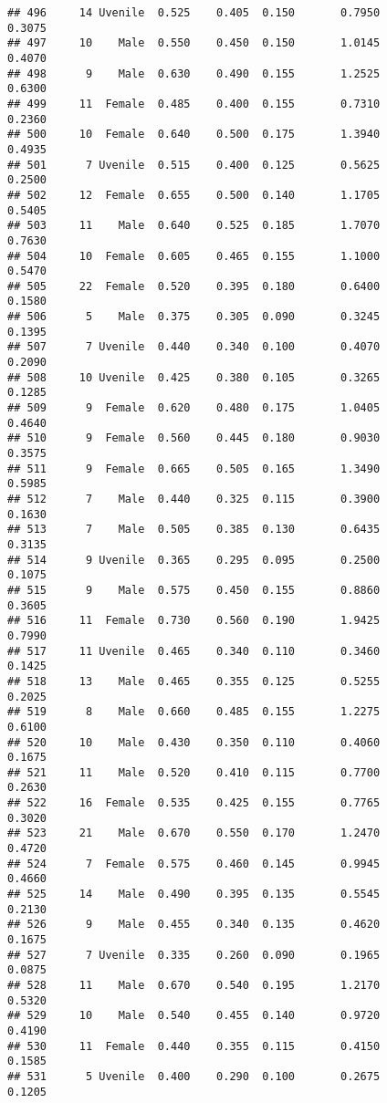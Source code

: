 \documentclass[
]{article}
\begin{document}
\begin{verbatim}
## 496     14 Uvenile  0.525    0.405  0.150       0.7950         0.3075
## 497     10    Male  0.550    0.450  0.150       1.0145         0.4070
## 498      9    Male  0.630    0.490  0.155       1.2525         0.6300
## 499     11  Female  0.485    0.400  0.155       0.7310         0.2360
## 500     10  Female  0.640    0.500  0.175       1.3940         0.4935
## 501      7 Uvenile  0.515    0.400  0.125       0.5625         0.2500
## 502     12  Female  0.655    0.500  0.140       1.1705         0.5405
## 503     11    Male  0.640    0.525  0.185       1.7070         0.7630
## 504     10  Female  0.605    0.465  0.155       1.1000         0.5470
## 505     22  Female  0.520    0.395  0.180       0.6400         0.1580
## 506      5    Male  0.375    0.305  0.090       0.3245         0.1395
## 507      7 Uvenile  0.440    0.340  0.100       0.4070         0.2090
## 508     10 Uvenile  0.425    0.380  0.105       0.3265         0.1285
## 509      9  Female  0.620    0.480  0.175       1.0405         0.4640
## 510      9  Female  0.560    0.445  0.180       0.9030         0.3575
## 511      9  Female  0.665    0.505  0.165       1.3490         0.5985
## 512      7    Male  0.440    0.325  0.115       0.3900         0.1630
## 513      7    Male  0.505    0.385  0.130       0.6435         0.3135
## 514      9 Uvenile  0.365    0.295  0.095       0.2500         0.1075
## 515      9    Male  0.575    0.450  0.155       0.8860         0.3605
## 516     11  Female  0.730    0.560  0.190       1.9425         0.7990
## 517     11 Uvenile  0.465    0.340  0.110       0.3460         0.1425
## 518     13    Male  0.465    0.355  0.125       0.5255         0.2025
## 519      8    Male  0.660    0.485  0.155       1.2275         0.6100
## 520     10    Male  0.430    0.350  0.110       0.4060         0.1675
## 521     11    Male  0.520    0.410  0.115       0.7700         0.2630
## 522     16  Female  0.535    0.425  0.155       0.7765         0.3020
## 523     21    Male  0.670    0.550  0.170       1.2470         0.4720
## 524      7  Female  0.575    0.460  0.145       0.9945         0.4660
## 525     14    Male  0.490    0.395  0.135       0.5545         0.2130
## 526      9    Male  0.455    0.340  0.135       0.4620         0.1675
## 527      7 Uvenile  0.335    0.260  0.090       0.1965         0.0875
## 528     11    Male  0.670    0.540  0.195       1.2170         0.5320
## 529     10    Male  0.540    0.455  0.140       0.9720         0.4190
## 530     11  Female  0.440    0.355  0.115       0.4150         0.1585
## 531      5 Uvenile  0.400    0.290  0.100       0.2675         0.1205

\end{verbatim}
\end{document}
